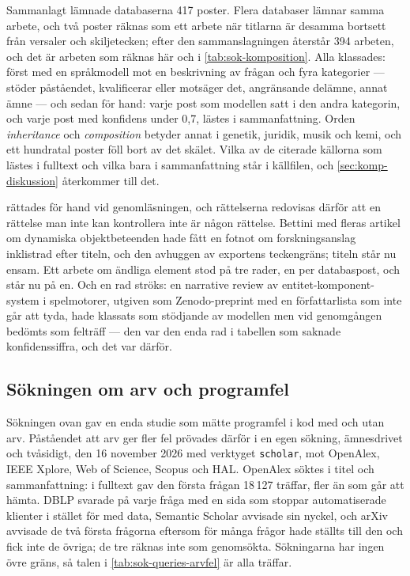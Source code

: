 Sammanlagt lämnade databaserna 417 poster.  Flera databaser lämnar
samma arbete, och två poster räknas som ett arbete när titlarna är
desamma bortsett från versaler och skiljetecken; efter den
sammanslagningen återstår 394 arbeten, och det är arbeten som räknas här
och i \cref{tab:sok-komposition}.  Alla klassades: först med
en språkmodell mot en beskrivning av frågan och fyra kategorier ---
stöder påståendet, kvalificerar eller motsäger det, angränsande delämne,
annat ämne --- och sedan för hand: varje post som modellen satt i den
andra kategorin, och varje post med konfidens under 0,7, lästes i
sammanfattning.  Orden \emph{inheritance} och \emph{composition} betyder
annat i genetik, juridik, musik och kemi, och ett hundratal poster föll
bort av det skälet.  Vilka av de citerade källorna som lästes i
fulltext och vilka bara i sammanfattning står i källfilen, och
\cref{sec:komp-diskussion} återkommer till det.

 rättades för hand vid genomläsningen, och
rättelserna redovisas därför att en rättelse man inte kan kontrollera
inte är någon rättelse.  Bettini med fleras artikel om dynamiska
objektbeteenden hade fått en fotnot om forskningsanslag inklistrad efter
titeln, och den avhuggen av exportens teckengräns; titeln står nu ensam.
Ett arbete om ändliga element stod på tre rader, en per databaspost, och
står nu på en.  Och en rad ströks: en \foreignlanguage{english}{narrative
review} av entitet-komponent-system i spelmotorer, utgiven som
Zenodo-preprint med en författarlista som inte går att tyda, hade
klassats som stödjande av modellen men vid genomgången bedömts som
felträff --- den var den enda rad i tabellen som saknade konfidenssiffra,
och det var därför.

\subsection{Sökningen om arv och programfel}
\label{sec:komp-fel-metod}

Sökningen ovan gav en enda studie som mätte programfel i kod med och
utan arv\autocite{CartwrightShepperd2000}.  Påståendet att arv ger fler
fel prövades därför i en egen sökning, ämnesdrivet och tvåsidigt, den 16
november 2026 med verktyget \texttt{scholar}, mot OpenAlex, IEEE Xplore,
Web of Science, Scopus och HAL.  OpenAlex söktes i titel och
sammanfattning: i fulltext gav den första frågan 18\,127 träffar, fler än
som går att hämta.  DBLP svarade på varje fråga med en sida som stoppar
automatiserade klienter i stället för med data, Semantic Scholar
avvisade sin nyckel, och arXiv avvisade de två första frågorna eftersom
för många frågor hade ställts till den och fick inte de övriga; de tre
räknas inte som genomsökta.  Sökningarna har ingen övre gräns, så talen
i \cref{tab:sok-queries-arvfel} är alla träffar.

